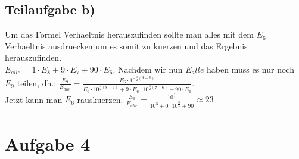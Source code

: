 \documentclass{article}
\begin{document}
\subsection*{Teilaufgabe b)}
Um das Formel Verhaeltnis herauszufinden sollte man alles mit dem $E_6$ Verhaeltnis ausdruecken um es somit zu kuerzen und das Ergebnis herauszufinden.\\
$E_{alle} = 1 \cdot E_8 + 9 \cdot E_7 + 90 \cdot E_6$. Nachdem wir nun $E_alle$ haben muss es nur noch $E_9$ teilen, dh.:
$\frac{E_9}{E_{alle}} = \frac{E_6 \cdot 10^{\frac{3}{2} (9 - 6)}}{E_6 \cdot 10^{\frac{3}{2}(8-6)} + 9 \cdot E_6 \cdot 10^{\frac{3}{2}(7-6)} + 90 \cdot E_6}$.\\Jetzt kann man $E_6$ rauskuerzen.
$\frac{E_9}{E_{alle}} = \frac{10^\frac{9}{2}}{10^3 + 0 \cdot 10^\frac{3}{2} + 90} \approx 23$

\section*{Aufgabe 4}
\end{document}
